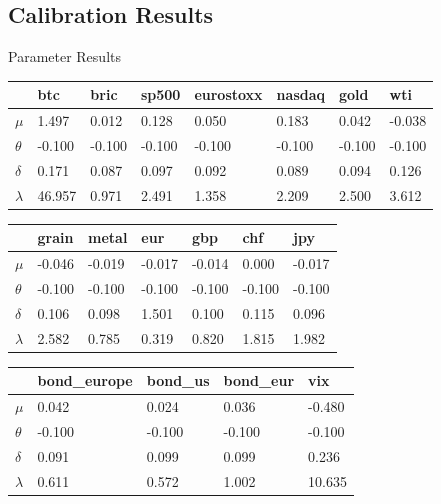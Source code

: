 \documentclass{beamer}
\newcommand\SmallerFont{\fontsize{8}{10}\selectfont}
\begin{document}
\subsection{Calibration Results}

\begin{frame}{Parameter Results}
\SmallerFont
\begin{table}[]
\begin{tabular}{llllllll}
\toprule
 & btc & bric & sp500 & eurostoxx & nasdaq & gold & wti \\
\midrule
$\mu$ & 1.497 & 0.012 & 0.128 & 0.050 & 0.183 & 0.042 & -0.038 \\
$\theta $& -0.100 & -0.100 & -0.100 & -0.100 & -0.100 & -0.100 & -0.100 \\
$\delta$ & 0.171 & 0.087 & 0.097 & 0.092 & 0.089 & 0.094 & 0.126 \\
$\lambda$ & 46.957 & 0.971 & 2.491 & 1.358 & 2.209 & 2.500 & 3.612 \\
\bottomrule
\end{tabular}
\end{table}

\begin{table}[]
\begin{tabular}{lllllll}
\toprule
 & grain & metal & eur & gbp & chf & jpy \\
\midrule
$\mu$ & -0.046 & -0.019 & -0.017 & -0.014 & 0.000 & -0.017 \\
$\theta$ & -0.100 & -0.100 & -0.100 & -0.100 & -0.100 & -0.100 \\
$\delta$ & 0.106 & 0.098 & 1.501 & 0.100 & 0.115 & 0.096 \\
$\lambda$ & 2.582 & 0.785 & 0.319 & 0.820 & 1.815 & 1.982 \\
\bottomrule
\end{tabular}

\end{table} 

\begin{table}[]
\begin{tabular}{lllll}
\toprule
 & bond\_europe & bond\_us & bond\_eur & vix \\
\midrule
$\mu $& 0.042 & 0.024 & 0.036 & -0.480 \\
$\theta $& -0.100 & -0.100 & -0.100 & -0.100 \\
$\delta$ & 0.091 & 0.099 & 0.099 & 0.236 \\
$\lambda $& 0.611 & 0.572 & 1.002 & 10.635 \\
\bottomrule
\end{tabular}
\end{table} 
\end{frame}
\end{document}
